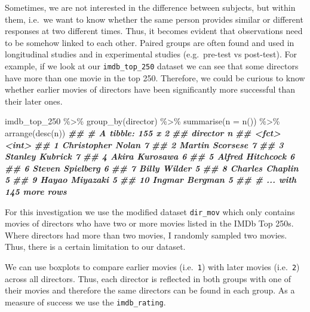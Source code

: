 \documentclass[
]{book}
\newenvironment{Shaded}{\begin{snugshade}}{\end{snugshade}}
\newcommand{\AttributeTok}[1]{\textcolor[rgb]{0.77,0.63,0.00}{#1}}
\newcommand{\DocumentationTok}[1]{\textcolor[rgb]{0.56,0.35,0.01}{\textbf{\textit{#1}}}}
\newcommand{\FunctionTok}[1]{\textcolor[rgb]{0.00,0.00,0.00}{#1}}
\newcommand{\NormalTok}[1]{#1}
\newcommand{\SpecialCharTok}[1]{\textcolor[rgb]{0.00,0.00,0.00}{#1}}
\begin{document}
Sometimes, we are not interested in the difference between subjects, but within them, i.e.~we want to know whether the same person provides similar or different responses at two different times. Thus, it becomes evident that observations need to be somehow linked to each other. Paired groups are often found and used in longitudinal studies and in experimental studies (e.g.~pre-test vs post-test). For example, if we look at our \texttt{imdb\_top\_250} dataset we can see that some directors have more than one movie in the top 250. Therefore, we could be curious to know whether earlier movies of directors have been significantly more successful than their later ones.

\begin{Shaded}
\begin{Highlighting}[]
\NormalTok{imdb\_top\_250 }\SpecialCharTok{\%\textgreater{}\%}
  \FunctionTok{group\_by}\NormalTok{(director) }\SpecialCharTok{\%\textgreater{}\%}
  \FunctionTok{summarise}\NormalTok{(}\AttributeTok{n =} \FunctionTok{n}\NormalTok{()) }\SpecialCharTok{\%\textgreater{}\%}
  \FunctionTok{arrange}\NormalTok{(}\FunctionTok{desc}\NormalTok{(n))}
\DocumentationTok{\#\# \# A tibble: 155 x 2}
\DocumentationTok{\#\#    director              n}
\DocumentationTok{\#\#    \textless{}fct\textgreater{}             \textless{}int\textgreater{}}
\DocumentationTok{\#\#  1 Christopher Nolan     7}
\DocumentationTok{\#\#  2 Martin Scorsese       7}
\DocumentationTok{\#\#  3 Stanley Kubrick       7}
\DocumentationTok{\#\#  4 Akira Kurosawa        6}
\DocumentationTok{\#\#  5 Alfred Hitchcock      6}
\DocumentationTok{\#\#  6 Steven Spielberg      6}
\DocumentationTok{\#\#  7 Billy Wilder          5}
\DocumentationTok{\#\#  8 Charles Chaplin       5}
\DocumentationTok{\#\#  9 Hayao Miyazaki        5}
\DocumentationTok{\#\# 10 Ingmar Bergman        5}
\DocumentationTok{\#\# \# ... with 145 more rows}
\end{Highlighting}
\end{Shaded}

For this investigation we use the modified dataset \texttt{dir\_mov} which only contains movies of directors who have two or more movies listed in the IMDb Top 250s. Where directors had more than two movies, I randomly sampled two movies. Thus, there is a certain limitation to our dataset.

We can use boxplots to compare earlier movies (i.e.~\texttt{1}) with later movies (i.e.~\texttt{2}) across all directors. Thus, each director is reflected in both groups with one of their movies and therefore the same directors can be found in each group. As a measure of success we use the \texttt{imdb\_rating}.
\end{document}

